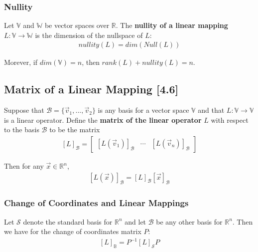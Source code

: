 \documentclass[a4paper,9pt]{extarticle}
\begin{document}
\begin{multicols*}{2}

\subsubsection{Nullity}
Let $\mathbb{V}$ and $\mathbb{W}$ be vector spaces over $\mathbb{R}$. The \textbf{nullity of a linear mapping} $L: \mathbb{V} \to \mathbb{W}$ is the dimension of the nullspace of $L$:
\begin{equation} \label{4.5-4}
    \begin{split}
        nullity(L) = dim(Null(L))
    \end{split}
\end{equation}

\noindent Morever, if $dim(\mathbb{V}) = n$, then $rank(L) + nullity(L) = n$.


\subsection{Matrix of a Linear Mapping [4.6]}

Suppose that $\mathcal{B} = \{\vec{v}_1, ..., \vec{v}_2\}$ is any basis for a vector space $\mathbb{V}$ and that $L : \mathbb{V} \to \mathbb{V}$ is a linear operator. Define the \textbf{matrix of the linear operator} $L$ with respect to the basis $\mathcal{B}$ to be the matrix
\begin{equation} \label{4.6-1}
    \begin{split}
        [L]_{\mathcal{B}} = \begin{bmatrix}[L(\vec{v}_1)]_{\mathcal{B}} & \cdots & [L(\vec{v}_n)]_{\mathcal{B}}\end{bmatrix}
    \end{split}
\end{equation}

\noindent Then for any $\vec{x} \in \mathbb{R}^n$,
\begin{equation} \label{4.6-2}
    \begin{split}
        [L(\vec{x})]_{\mathcal{B}} = [L]_{\mathcal{B}} [\vec{x}]_{\mathcal{B}}
    \end{split}
\end{equation}


\subsubsection{Change of Coordinates and Linear Mappings}
Let $\mathcal{S}$ denote the standard basis for $\mathbb{R}^n$ and let $\mathcal{B}$ be any other basis for $\mathbb{R}^n$. Then we have for the change of coordinates matrix $P$:
\begin{equation} \label{4.6-3}
    \begin{split}
        [L]_{\mathbb{B}} = P^{-1} [L]_{\mathcal{S}} P
    \end{split}
\end{equation}


\end{multicols*}
\end{document}
